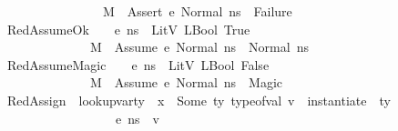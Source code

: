 \begin{isabellebody}
\ \ \ \ \ \ \ \ \ \ \ \ \ \ \ \ \ \ M{\isacharcomma}{\kern0pt}{\isasymLambda}{\isacharcomma}{\kern0pt}{\isasymGamma}{\isacharcomma}{\kern0pt}{\isasymOmega}\ {\isasymturnstile}\ {\isasymlangle}Assert\ e{\isacharcomma}{\kern0pt}\ Normal\ n{\isacharunderscore}{\kern0pt}s{\isasymrangle}\ {\isasymrightarrow}\ Failure{\isachardoublequoteclose}\isanewline
\ \ {\isacharbar}{\kern0pt}\ RedAssumeOk{\isacharcolon}{\kern0pt}\ {\isachardoublequoteopen}{\isasymlbrakk}\ {\isasymLambda}{\isacharcomma}{\kern0pt}{\isasymGamma}{\isacharcomma}{\kern0pt}{\isasymOmega}\ {\isasymturnstile}\ {\isasymlangle}e{\isacharcomma}{\kern0pt}\ n{\isacharunderscore}{\kern0pt}s{\isasymrangle}\ {\isasymDown}\ LitV\ {\isacharparenleft}{\kern0pt}LBool\ True{\isacharparenright}{\kern0pt}\ {\isasymrbrakk}\ {\isasymLongrightarrow}\ \isanewline
\ \ \ \ \ \ \ \ \ \ \ \ \ \ \ \ M{\isacharcomma}{\kern0pt}{\isasymLambda}{\isacharcomma}{\kern0pt}{\isasymGamma}{\isacharcomma}{\kern0pt}{\isasymOmega}\ {\isasymturnstile}\ {\isasymlangle}Assume\ e{\isacharcomma}{\kern0pt}\ Normal\ n{\isacharunderscore}{\kern0pt}s{\isasymrangle}\ {\isasymrightarrow}\ Normal\ n{\isacharunderscore}{\kern0pt}s{\isachardoublequoteclose}\isanewline
\ \ {\isacharbar}{\kern0pt}\ RedAssumeMagic{\isacharcolon}{\kern0pt}\ {\isachardoublequoteopen}{\isasymlbrakk}\ {\isasymLambda}{\isacharcomma}{\kern0pt}{\isasymGamma}{\isacharcomma}{\kern0pt}{\isasymOmega}\ {\isasymturnstile}\ {\isasymlangle}e{\isacharcomma}{\kern0pt}\ n{\isacharunderscore}{\kern0pt}s{\isasymrangle}\ {\isasymDown}\ LitV\ {\isacharparenleft}{\kern0pt}LBool\ False{\isacharparenright}{\kern0pt}\ {\isasymrbrakk}\ {\isasymLongrightarrow}\ \isanewline
\ \ \ \ \ \ \ \ \ \ \ \ \ \ \ \ M{\isacharcomma}{\kern0pt}{\isasymLambda}{\isacharcomma}{\kern0pt}{\isasymGamma}{\isacharcomma}{\kern0pt}{\isasymOmega}\ {\isasymturnstile}\ {\isasymlangle}Assume\ e{\isacharcomma}{\kern0pt}\ Normal\ n{\isacharunderscore}{\kern0pt}s{\isasymrangle}\ {\isasymrightarrow}\ Magic{\isachardoublequoteclose}\isanewline
\ \ {\isacharbar}{\kern0pt}\ RedAssign{\isacharcolon}{\kern0pt}\ {\isachardoublequoteopen}{\isasymlbrakk}\ lookup{\isacharunderscore}{\kern0pt}var{\isacharunderscore}{\kern0pt}ty\ {\isasymLambda}\ x\ {\isacharequal}{\kern0pt}\ Some\ ty{\isacharsemicolon}{\kern0pt}\ type{\isacharunderscore}{\kern0pt}of{\isacharunderscore}{\kern0pt}val\ v\ {\isacharequal}{\kern0pt}\ instantiate\ {\isasymOmega}\ ty{\isacharsemicolon}{\kern0pt}\ \isanewline
\ \ \ \ \ \ \ \ \ \ \ \ \ \ \ \ \ \ {\isasymLambda}{\isacharcomma}{\kern0pt}{\isasymGamma}{\isacharcomma}{\kern0pt}{\isasymOmega}\ {\isasymturnstile}\ {\isasymlangle}e{\isacharcomma}{\kern0pt}\ n{\isacharunderscore}{\kern0pt}s{\isasymrangle}\ {\isasymDown}\ v\ {\isasymrbrakk}\ {\isasymLongrightarrow}\isanewline

\end{isabellebody}
